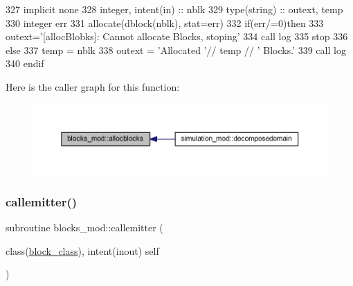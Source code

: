 \begin{DoxyCode}
327     \textcolor{keywordtype}{implicit none}
328     \textcolor{keywordtype}{integer}, \textcolor{keywordtype}{intent(in)} ::  nblk
329     \textcolor{keywordtype}{type}(string) :: outext, temp
330     \textcolor{keywordtype}{integer} err
331     \textcolor{keyword}{allocate}(dblock(nblk), stat=err)
332     \textcolor{keywordflow}{if}(err/=0)\textcolor{keywordflow}{then}
333         outext=\textcolor{stringliteral}{'[allocBlobks]: Cannot allocate Blocks, stoping'}
334         \textcolor{keyword}{call }log%
335         stop
336     \textcolor{keywordflow}{else}
337         temp = nblk
338         outext = \textcolor{stringliteral}{'Allocated '}// temp // \textcolor{stringliteral}{' Blocks.'}
339         \textcolor{keyword}{call }log%
340 \textcolor{keywordflow}{    endif}
\end{DoxyCode}
Here is the caller graph for this function\+:\nopagebreak
\begin{figure}[H]
\begin{center}
\leavevmode
\includegraphics[width=350pt]{namespaceblocks__mod_a639beb0fee2290d46353f4b4702d6711_icgraph}
\end{center}
\end{figure}
\mbox{\label{namespaceblocks__mod_a2c3cf5113e1422d812c2c869afde2729}} 
\subsubsection{\texorpdfstring{callemitter()}{callemitter()}}
{\footnotesize\ttfamily subroutine blocks\+\_\+mod\+::callemitter (\begin{DoxyParamCaption}\item[{class(\mbox{\hyperlink{structblocks__mod_1_1block__class}{block\+\_\+class}}), intent(inout)}]{self }\end{DoxyParamCaption})\hspace{0.3cm}{\ttfamily [private]}}



